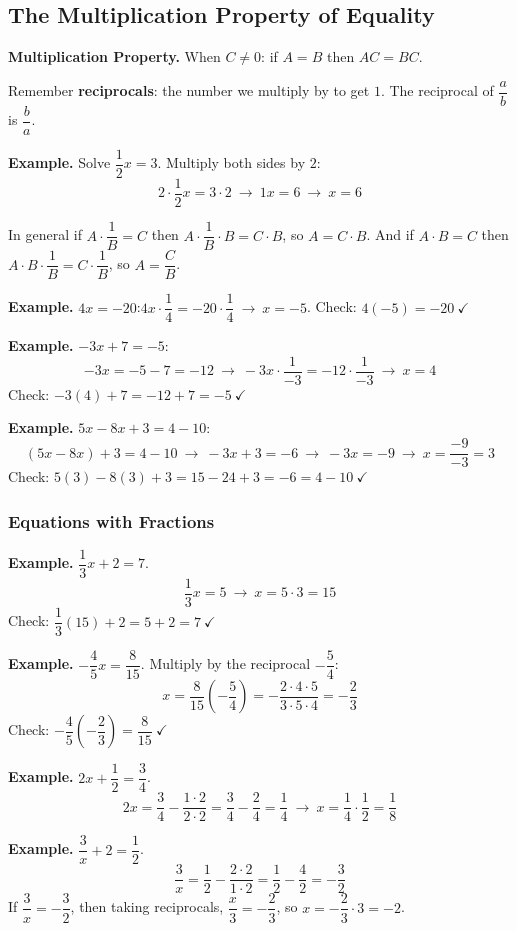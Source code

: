 \documentclass[letter]{article}
\newenvironment{keybox}
  {\begin{lrbox}{\keyboxsave}\begin{minipage}{\dimexpr\linewidth-2\fboxsep-2\fboxrule\relax}}
  {\end{minipage}\end{lrbox}\par\noindent\fbox{\usebox{\keyboxsave}}\par}
\begin{document}
\subsection{The Multiplication Property of Equality}

\begin{keybox}
\textbf{Multiplication Property.} When $C\neq0$: if $A=B$ then $AC=BC$.
\end{keybox}

Remember \textbf{reciprocals}: the number we multiply by to get $1$. The reciprocal of $\dfrac ab$ is $\dfrac ba$.

\textbf{Example.} Solve $\dfrac12x=3$. Multiply both sides by $2$:
\[2\cdot\frac12x=3\cdot2\ \to\ 1x=6\ \to\ x=6\]

In general if $A\cdot\dfrac1B=C$ then $A\cdot\dfrac1B\cdot B=C\cdot B$, so $A=C\cdot B$. And if $A\cdot B=C$ then $A\cdot B\cdot\dfrac1B=C\cdot\dfrac1B$, so $A=\dfrac CB$.

\textbf{Example.} $4x=-20$:\quad $4x\cdot\dfrac14=-20\cdot\dfrac14\ \to\ x=-5$. Check: $4(-5)=-20\ \checkmark$

\textbf{Example.} $-3x+7=-5$:
\[-3x=-5-7=-12\ \to\ -3x\cdot\frac1{-3}=-12\cdot\frac1{-3}\ \to\ x=4\]
Check: $-3(4)+7=-12+7=-5\ \checkmark$

\textbf{Example.} $5x-8x+3=4-10$:
\[(5x-8x)+3=4-10\ \to\ -3x+3=-6\ \to\ -3x=-9\ \to\ x=\frac{-9}{-3}=3\]
Check: $5(3)-8(3)+3=15-24+3=-6=4-10\ \checkmark$

\subsubsection*{Equations with Fractions}

\textbf{Example.} $\dfrac13x+2=7$.
\[\frac13x=5\ \to\ x=5\cdot3=15\]
Check: $\dfrac13(15)+2=5+2=7\ \checkmark$

\textbf{Example.} $-\dfrac45x=\dfrac8{15}$. Multiply by the reciprocal $-\dfrac54$:
\[x=\frac8{15}\left(-\frac54\right)=-\frac{2\cdot4\cdot5}{3\cdot5\cdot4}=-\frac23\]
Check: $-\dfrac45\left(-\dfrac23\right)=\dfrac8{15}\ \checkmark$

\textbf{Example.} $2x+\dfrac12=\dfrac34$.
\[2x=\frac34-\frac{1\cdot2}{2\cdot2}=\frac34-\frac24=\frac14\ \to\ x=\frac14\cdot\frac12=\frac18\]

\textbf{Example.} $\dfrac3x+2=\dfrac12$.
\[\frac3x=\frac12-\frac{2\cdot2}{1\cdot2}=\frac12-\frac42=-\frac32\]
If $\dfrac3x=-\dfrac32$, then taking reciprocals, $\dfrac x3=-\dfrac23$, so $x=-\dfrac23\cdot3=-2$.
\end{document}
